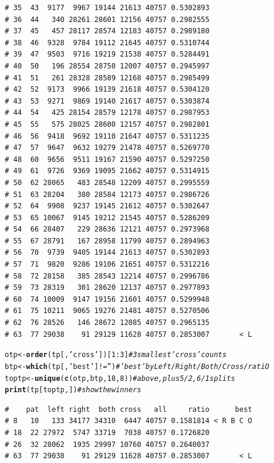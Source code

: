 \documentclass{article}\usepackage[]{graphicx}\usepackage[]{color}
\makeatletter
\newcommand{\hlnum}[1]{\textcolor[rgb]{0.686,0.059,0.569}{#1}}%
\newcommand{\hlstr}[1]{\textcolor[rgb]{0.192,0.494,0.8}{#1}}%
\newcommand{\hlcom}[1]{\textcolor[rgb]{0.678,0.584,0.686}{\textit{#1}}}%
\newcommand{\hlopt}[1]{\textcolor[rgb]{0,0,0}{#1}}%
\newcommand{\hlstd}[1]{\textcolor[rgb]{0.345,0.345,0.345}{#1}}%
\newcommand{\hlkwb}[1]{\textcolor[rgb]{0.69,0.353,0.396}{#1}}%
\newcommand{\hlkwd}[1]{\textcolor[rgb]{0.737,0.353,0.396}{\textbf{#1}}}%
\newenvironment{kframe}{%
 \def\at@end@of@kframe{}%
 \ifinner\ifhmode%
  \def\at@end@of@kframe{\end{minipage}}%
  \begin{minipage}{\columnwidth}%
 \fi\fi%
 \def\FrameCommand##1{\hskip\@totalleftmargin \hskip-\fboxsep
 \colorbox{shadecolor}{##1}\hskip-\fboxsep
     \hskip-\linewidth \hskip-\@totalleftmargin \hskip\columnwidth}%
 \MakeFramed {\advance\hsize-\width
   \@totalleftmargin\z@ \linewidth\hsize
   \@setminipage}}%
 {\par\unskip\endMakeFramed%
 \at@end@of@kframe}
\newenvironment{knitrout}{}{} %
\makeatother
\begin{document}
\begin{knitrout}
\begin{kframe}
\begin{verbatim}
# 35  43  9177  9967 19144 21613 40757 0.5302893          
# 36  44   340 28261 28601 12156 40757 0.2982555          
# 37  45   457 28117 28574 12183 40757 0.2989180          
# 38  46  9328  9784 19112 21645 40757 0.5310744          
# 39  47  9503  9716 19219 21538 40757 0.5284491          
# 40  50   196 28554 28750 12007 40757 0.2945997          
# 41  51   261 28328 28589 12168 40757 0.2985499          
# 42  52  9173  9966 19139 21618 40757 0.5304120          
# 43  53  9271  9869 19140 21617 40757 0.5303874          
# 44  54   425 28154 28579 12178 40757 0.2987953          
# 45  55   575 28025 28600 12157 40757 0.2982801          
# 46  56  9418  9692 19110 21647 40757 0.5311235          
# 47  57  9647  9632 19279 21478 40757 0.5269770          
# 48  60  9656  9511 19167 21590 40757 0.5297250          
# 49  61  9726  9369 19095 21662 40757 0.5314915          
# 50  62 28065   483 28548 12209 40757 0.2995559          
# 51  63 28204   380 28584 12173 40757 0.2986726          
# 52  64  9908  9237 19145 21612 40757 0.5302647          
# 53  65 10067  9145 19212 21545 40757 0.5286209          
# 54  66 28407   229 28636 12121 40757 0.2973968          
# 55  67 28791   167 28958 11799 40757 0.2894963          
# 56  70  9739  9405 19144 21613 40757 0.5302893          
# 57  71  9820  9286 19106 21651 40757 0.5312216          
# 58  72 28158   385 28543 12214 40757 0.2996786          
# 59  73 28319   301 28620 12137 40757 0.2977893          
# 60  74 10009  9147 19156 21601 40757 0.5299948          
# 61  75 10211  9065 19276 21481 40757 0.5270506          
# 62  76 28526   146 28672 12085 40757 0.2965135          
# 63  77 29038    91 29129 11628 40757 0.2853007       < L
\end{verbatim}
\end{kframe}
\end{knitrout}
\begin{knitrout}\footnotesize
{}\color{fgcolor}\begin{kframe}
\begin{alltt}
\hlstd{otp} \hlkwb{<-} \hlkwd{order}\hlstd{(tp[,}\hlstr{'cross'}\hlstd{])[}\hlnum{1}\hlopt{:}\hlnum{3}\hlstd{]}    \hlcom{# 3 smallest 'cross' counts}
\hlstd{btp} \hlkwb{<-} \hlkwd{which}\hlstd{(tp[,}\hlstr{'best'}\hlstd{]} \hlopt{!=} \hlstr{''}\hlstd{)}    \hlcom{# 'best' by Left/Right/Both/Cross/ratiO}
\hlstd{toptp} \hlkwb{<-} \hlkwd{unique}\hlstd{(}\hlkwd{c}\hlstd{(otp,btp,}\hlnum{18}\hlstd{,}\hlnum{8}\hlstd{))}   \hlcom{# above, plus 5/2, 6/1 splits}
\hlkwd{print}\hlstd{(tp[toptp,])}                  \hlcom{# show the winners}
\end{alltt}
\begin{verbatim}
#    pat  left right  both cross   all     ratio      best
# 8   10   133 34177 34310  6447 40757 0.1581814 < R B C O
# 18  22 27972  5747 33719  7038 40757 0.1726820          
# 26  32 28062  1935 29997 10760 40757 0.2640037          
# 63  77 29038    91 29129 11628 40757 0.2853007       < L
\end{verbatim}
\end{kframe}
\end{knitrout}
\end{document}
